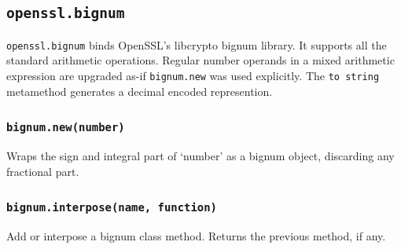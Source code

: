 \documentclass[11pt, oneside]{memoir}
\newcommand*{\fn}[1]{\texttt{#1}\xspace}
\newcommand*{\method}[1]{\texttt{#1}\xspace}
\newcommand*{\module}[1]{\texttt{#1}\xspace}
\newcounter{toccols}
\newenvironment{Module}[1]{
	\subsection{\texttt{#1}}
	\addtocontents{toc}{
		\protect\begin{multicols}{\value{toccols}}
	}
}{
	\addtocontents{toc}{\protect\end{multicols}}
}
\begin{document}
\begin{Module}{openssl.bignum}

\module{openssl.bignum} binds OpenSSL's libcrypto bignum library. It supports all the standard arithmetic operations. Regular number operands in a mixed arithmetic expression are upgraded as-if \method{bignum.new} was used explicitly. The \fn{to string} metamethod generates a decimal encoded represention.

\subsubsection[\fn{bignum.new}]{\fn{bignum.new(number)}}

Wraps the sign and integral part of `number' as a bignum object, discarding any fractional part.

\subsubsection[\fn{bignum.interpose}]{\fn{bignum.interpose(name, function)}}

Add or interpose a bignum class method. Returns the previous method, if any.

\end{Module}
\end{document}
